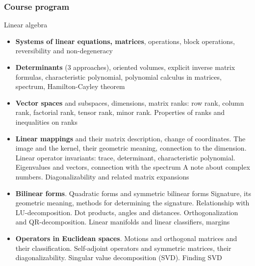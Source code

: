 \documentclass[fullscreen=true, bookmarks=true, hyperref={pdfencoding=unicode}]{beamer}
\begin{document}
\begin{frame}
  \frametitle{Course program}
  
  \pause
  Linear algebra
  {\scriptsize
  \begin{itemize}
      \item \textbf{Systems of linear equations, matrices}, operations, block operations, 
      reversibility and non-degeneracy
      \item \textbf{Determinants} (3 approaches), oriented volumes, explicit inverse matrix formulas, 
      characteristic polynomial, polynomial calculus in matrices, spectrum, Hamilton-Cayley theorem
      \item \textbf{Vector spaces} and subspaces, dimensions, matrix ranks: row rank, column rank, 
      factorial rank, tensor rank, minor rank. Properties of ranks and inequalities on ranks
      \item \textbf{Linear mappings} and their matrix description, change of coordinates. 
      The image and the kernel, their geometric meaning, connection to the dimension. 
      Linear operator invariants: trace, determinant, characteristic polynomial. 
      Eigenvalues and vectors, connection with the spectrum
      A note about complex numbers. Diagonalizability and related matrix expansions
      \item \textbf{Bilinear forms}. Quadratic forms and symmetric bilinear forms
      Signature, its geometric meaning, methods for determining the signature. 
      Relationship with LU-decomposition. Dot products, angles and distances. 
      Orthogonalization and QR-decomposition. Linear manifolds and linear classifiers, margins
      \item \textbf{Operators in Euclidean spaces}. Motions and orthogonal matrices and their classification. 
      Self-adjoint operators and symmetric matrices, their diagonalizability. 
      Singular value decomposition (SVD). Finding SVD
  \end{itemize}
  }
\end{frame}
\end{document}
